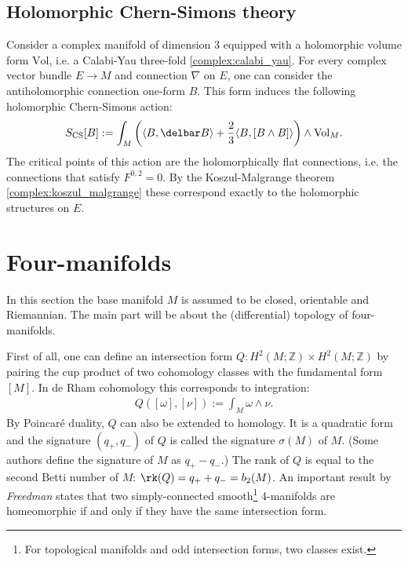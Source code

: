 \subsection{Holomorphic Chern-Simons theory}

    Consider a complex manifold of dimension 3 equipped with a holomorphic volume form $\mathrm{Vol}$, i.e. a Calabi-Yau three-fold \ref{complex:calabi_yau}. For every complex vector bundle $E\rightarrow M$ and connection $\nabla$ on $E$, one can consider the antiholomorphic connection one-form $B$. This form induces the following holomorphic Chern-Simons action:
    \begin{gather}
        S_\mathrm{CS}[B]:=\int_M\left(\langle B,\delbar B \rangle+\frac{2}{3}
        \langle B,[B\wedge B] \rangle\right)\wedge\mathrm{Vol}_M.
    \end{gather}
    The critical points of this action are the holomorphically flat connections, i.e. the connections that satisfy $F^{0,2}=0$. By the Koszul-Malgrange theorem \ref{complex:koszul_malgrange} these correspond exactly to the holomorphic structures on $E$.

\section{Four-manifolds}

    In this section the base manifold $M$ is assumed to be closed, orientable and Riemannian. The main part will be about the (differential) topology of four-manifolds.

    First of all, one can define an intersection form $Q:H^2(M;\mathbb{Z})\times H^2(M;\mathbb{Z})$ by pairing the cup product of two cohomology classes with the fundamental form $[M]$. In de Rham cohomology this corresponds to integration:
    \begin{gather}
        Q([\omega],[\nu]) := \int_M\omega\wedge\nu.
    \end{gather}
    By Poincar\'e duality, $Q$ can also be extended to homology. It is a quadratic form and the signature $(q_+,q_-)$ of $Q$ is called the signature $\sigma(M)$ of $M$. (Some authors define the signature of $M$ as $q_+-q_-$.) The rank of $Q$ is equal to the second Betti number of $M$: $\rk(Q)=q_++q_-=b_2(M)$. An important result by \textit{Freedman} states that two simply-connected smooth\footnote{For topological manifolds and odd intersection forms, two classes exist.} 4-manifolds are homeomorphic if and only if they have the same intersection form.

